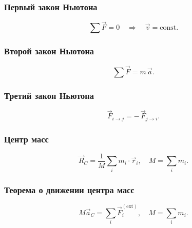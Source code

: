 \documentclass[12pt, a4paper]{article}
\begin{document}
\subsubsection*{Первый закон Ньютона}
\[
\sum\vec F = 0 \quad\Longrightarrow\quad \vec v = \text{const}.
\]

\subsubsection*{Второй закон Ньютона}
\[
\sum\vec F = m\,\vec a.
\]

\subsubsection*{Третий закон Ньютона}
\[
\vec F_{i\to j} = -\,\vec F_{j\to i}.
\]

\subsubsection*{Центр масс}
\[
\vec R_C = \frac{1}{M}\sum_i m_i\cdot\vec r_i,
\quad
M=\sum_i m_i.
\]

\subsubsection*{Теорема о движении центра масс}
\[
M\vec a_C = \sum_i \vec F_i^{\mathrm{(ext)}}, 
\quad M=\sum_i m_i.
\]
\end{document}
